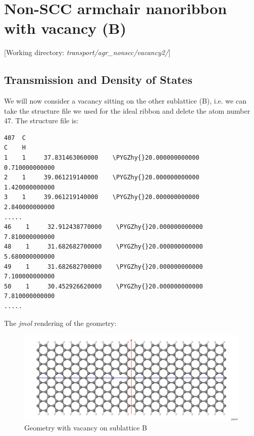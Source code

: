 \documentclass[a4paper,11pt,english]{sphinxmanual}
\def\PYGZhy{\char`\-}
\begin{document}
{{\newpage
\section{Non-SCC armchair nanoribbon with vacancy (B)}
\label{transport:non-scc-armchair-nanoribbon-with-vacancy-b}
{[}Working directory: \emph{transport/agr\_nonscc/vacancy2/}{]}


\subsection{Transmission and Density of States}
\label{transport:id2}
We will now consider a vacancy sitting on the other sublattice (B),
i.e. we can take the structure file we used for the ideal ribbon and
delete the atom number 47. The structure file is:

\begin{Verbatim}[commandchars=\\\{\}]
407  C
C    H
1    1     37.831463060000    \PYGZhy{}20.000000000000      0.710000000000
2    1     39.061219140000    \PYGZhy{}20.000000000000      1.420000000000
3    1     39.061219140000    \PYGZhy{}20.000000000000      2.840000000000
.....
46    1     32.912438770000    \PYGZhy{}20.000000000000      7.810000000000
48    1     31.682682700000    \PYGZhy{}20.000000000000      5.680000000000
49    1     31.682682700000    \PYGZhy{}20.000000000000      7.100000000000
50    1     30.452926620000    \PYGZhy{}20.000000000000      7.810000000000
.....
\end{Verbatim}

The \emph{jmol} rendering of the geometry:
\begin{figure}[htbp]
\centering
\capstart
\includegraphics[width=0.800\linewidth]{device_7_vac2.png}
\caption{Geometry with vacancy on sublattice B}\end{figure}

}}
\end{document}
